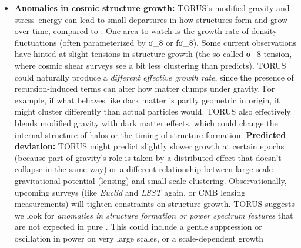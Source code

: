 \documentclass[
]{article}
\begin{document}
{\begin{itemize}
  (roughly half the horizon), that would hint at a toroidal boundary
  effect\hspace{0pt}. TORUS specifically predicts a ``faint repeating
  clustering'' at such scales\hspace{0pt}. If such a signal is found, it
  would \textbf{go beyond \LambdaCDM} (which has no reason for a correlation
  at that scale) and strongly support the TORUS recursion model.
  Conversely, if surveys with increasing volume find \emph{no} sign of
  any large-scale correlations (ruling out even tiny effects), it would
  impose stringent limits on TORUS's recursion amplitude, potentially
  falsifying this aspect of the theory\hspace{0pt}. In short, the
  presence or absence of cosmic-scale clustering patterns is a litmus
  test between TORUS and the standard model.
\item
  \textbf{Anomalies in cosmic structure growth:} TORUS's modified
  gravity and stress--energy can lead to small departures in how
  structures form and grow over time, compared to \LambdaCDM. One area to
  watch is the growth rate of density fluctuations (often parameterized
  by σ_{8}{} or
  fσ_{8}). Some current
  observations have hinted at slight tensions in structure growth (the
  so-called σ_{8}{}
  tension, where cosmic shear surveys see a bit less clustering than
  \LambdaCDM predicts). TORUS could naturally produce a \emph{different
  effective growth rate}, since the presence of recursion-induced terms
  can alter how matter clumps under gravity. For example, if what
  behaves like dark matter is partly geometric in origin, it might
  cluster differently than actual particles would. TORUS also
  effectively blends modified gravity with dark matter effects, which
  could change the internal structure of halos or the timing of
  structure formation. \textbf{Predicted deviation:} TORUS might predict
  slightly slower growth at certain epochs (because part of gravity's
  role is taken by a distributed effect that doesn't collapse in the
  same way) or a different relationship between large-scale
  gravitational potential (lensing) and small-scale clustering.
  Observationally, upcoming surveys (like \emph{Euclid} and \emph{LSST}
  again, or CMB lensing measurements) will tighten constraints on
  structure growth. TORUS suggests we look for \emph{anomalies in
  structure formation or power spectrum features} that are not expected
  in pure \LambdaCDM\hspace{0pt}. This could include a gentle suppression or
  oscillation in power on very large scales, or a scale-dependent growth

\end{itemize}}
\end{document}
